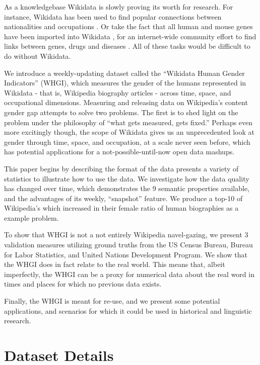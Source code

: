 \documentclass[letterpaper]{article}
\begin{document}
As a knowledgebase Wikidata is slowly proving its worth for research. For instance, Wikidata has been used to find popular connections between nationalities and occupations \cite{goldfarb_quantifying_2015}. Or take the fact that all human and mouse genes have been imported into Wikidata \cite{mitraka_wikidata:_2015}, for an internet-wide community effort to find links between genes, drugs and diseases \cite{burgstaller-muehlbacher_wikidata_2015}. All of these tasks would be difficult to do without Wikidata.

We introduce a weekly-updating dataset called the ``Wikidata Human Gender Indicators'' (WHGI), which measures the gender of the humans represented in Wikidata - that is, Wikipedia biography articles - across time, space, and occupational dimensions. Measuring and releasing data on Wikipedia's content gender gap attempts to solve two problems. The first is to shed light on the problem under the philosophy of ``what gets measured, gets fixed.'' Perhaps even more excitingly though, the scope of Wikidata gives us an unprecedented look at gender through time, space, and occupation, at a scale never seen before, which has potential applications for a not-possible-until-now open data mashups.

This paper begins by describing the format of the data presents a variety of statistics to illustrate how to use the data. We investigate how the data quality has changed over time, which demonstrates the 9 semantic properties available, and the advantages of its weekly, ``snapshot'' feature. We produce a top-10 of Wikipedia's which increased in their female ratio of human biographies as a example problem. 

To show that WHGI is not a not entirely Wikipedia navel-gazing, we present 3 validation measures utilizing ground truths from the US Census Bureau, Bureau for Labor Statistics, and United Nations Development Program. We show that the WHGI does in fact relate to the real world. This means that, albeit imperfectly, the WHGI can be a proxy for numerical data about the real word in times and places for which no previous data exists.

Finally, the WHGI is meant for re-use, and we present some potential applications, and scenarios for which it could be used in historical and linguistic research.  

\section{Dataset Details}
\end{document}
